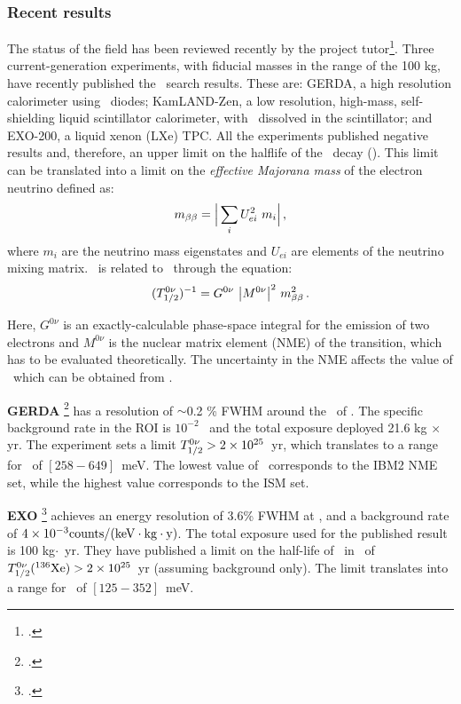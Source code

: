 \documentclass[a4paper,11pt,oneside]{article}
\begin{document}
\subsubsection*{Recent results}
The status of the field has been reviewed recently by the project tutor\footcite{INSS2014}. Three current-generation experiments, with fiducial masses in the range of the 100 kg, have recently published the \bbonu\ search results. These are: GERDA, a high resolution calorimeter using \GE\ diodes; KamLAND-Zen, a low resolution, high-mass, self-shielding liquid scintillator calorimeter, with \XE\ dissolved in the scintillator; and EXO-200, a liquid xenon (LXe) TPC. All the experiments published negative results and, therefore, an upper limit on the halflife of the \bbonu\ decay (\Tonu). This limit can be translated into a limit on the \emph{effective Majorana mass} of the electron neutrino defined as:
\begin{equation}
m_{\beta\beta} = \Big| \sum_{i} U^{2}_{ei} \ m_{i} \Big| \, ,
\end{equation}
%
where $m_{i}$ are the neutrino mass eigenstates and $U_{ei}$ are elements of the neutrino mixing matrix. \mbb\ is related to \Tonu\ through the equation:
\begin{equation}
(T^{0\nu}_{1/2})^{-1} = G^{0\nu} \ \big|M^{0\nu}\big|^{2} \ m_{\beta\beta}^{2} \, .
\label{eq:Tonu}
\end{equation}

Here, $G^{0\nu}$ is an exactly-calculable phase-space integral for the emission of two electrons and $M^{0\nu}$ is the nuclear matrix element (NME) of the transition, which has to be evaluated theoretically. The uncertainty in the NME affects the value of \mbb\ which can be obtained from \Tonu.
 
{\bf GERDA} \footcite{Agostini:2013mzu} has a resolution of $\sim$0.2 \% FWHM around the \Qbb\ of \GE. The specific background rate in the ROI is $10^{-2}$ \ckky\ and the total exposure deployed 21.6 kg $\times$ yr. The experiment sets a limit $T_{1/2}^{0\nu} > 2 \times 10^{25}$~yr, which translates to a range for \mbb\ of $[258-649]$~meV. The lowest value of \mbb\ corresponds to the IBM2 NME set, while the highest value corresponds to the ISM set.

{\bf EXO} \footcite{Albert:2014awa} achieves an energy resolution of 3.6\% FWHM at \Qbb, and a background rate of $ 4 \times 10^{-3}\rm counts/(keV \cdot kg \cdot y)$. The total exposure used for the published result is 100 kg$\cdot$~yr. They have published a limit on the half-life of \bbonu\ in \XE\ of $T_{1/2}^{0\nu}({}^{136}\rm Xe) > 2 \times 10^{25}$~yr (assuming background only). The limit translates into a range for \mbb\ of $[125-352]$~meV.
\end{document}
